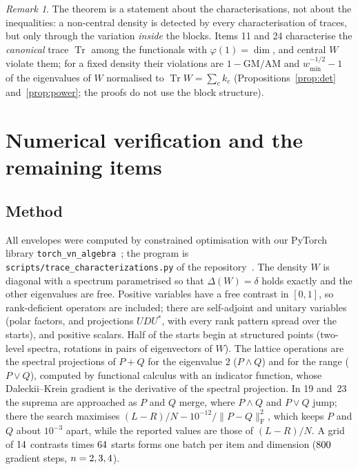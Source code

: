 \documentclass[11pt]{article}
\DeclareMathOperator{\Tr}{Tr}
\theoremstyle{plain}
\theoremstyle{definition}
\theoremstyle{remark}
\newtheorem{remark}[theorem]{Remark}
\begin{document}
\begin{remark}
The theorem is a statement about the characterisations, not about the inequalities: a non-central density is detected by
every characterisation of traces, but only through the variation \emph{inside} the blocks. Items 11 and 24 characterise
the \emph{canonical} trace $\Tr$ among the functionals with $\varphi(1)=\dim$, and central $W$ violate them; for a fixed
density their violations are $1-\mathrm{GM}/\mathrm{AM}$ and $w_{\min}^{-1/2}-1$ of the eigenvalues of $W$ normalised to
$\Tr W=\sum_ck_c$ (Propositions~\ref{prop:det} and~\ref{prop:power}; the proofs do not use the block structure).
\end{remark}

\section{Numerical verification and the remaining items}\label{sec:numerics}

\subsection{Method}
All envelopes were computed by constrained optimisation with our PyTorch library \texttt{torch\_\allowbreak vn\_\allowbreak algebra}~\cite{lib}; the program is \texttt{scripts/\allowbreak trace\_\allowbreak characterizations.py} of the
repository~\cite{lib}. The density $W$ is diagonal with a spectrum parametrised so that $\Delta(W)=\delta$ holds exactly
and the other eigenvalues are free. Positive variables have a free contrast in $[0,1]$, so rank-deficient operators are
included; there are self-adjoint and unitary variables (polar factors, and projections $UDU^*$, with every rank pattern
spread over the starts), and positive scalars. Half of the starts begin at structured points (two-level spectra, rotations
in pairs of eigenvectors of $W$). The lattice operations are the spectral projections of $P+Q$ for the eigenvalue $2$ ($P\wedge
Q$) and for the range ($P\vee Q$), computed by functional calculus with an indicator function, whose Daleckii--Krein
gradient is the derivative of the spectral projection. In 19 and~23 the suprema are approached as $P$ and $Q$ merge, where
$P\wedge Q$ and $P\vee Q$ jump; there the search maximises $(L-R)/N-10^{-12}/\|P-Q\|_{\mathrm F}^2$, which keeps $P$ and $Q$
about $10^{-3}$ apart, while the reported values are those of $(L-R)/N$. A grid of $14$ contrasts times
$64$ starts forms one batch per item and dimension ($800$ gradient steps, $n=2, 3, 4$).
\end{document}
